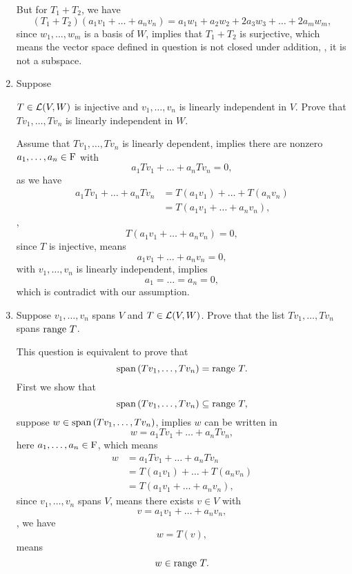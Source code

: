 \begin{enumerate}
\begin{solution}
            But for $T_1+T_2$, we have 
            \[ (T_1+T_2)(a_1v_1 + \dots + a_nv_n) = a_1w_1 + a_2w_2 + 2a_3w_3 + \dots + 2a_mw_m ,\]
            since $w_1, \ldots, w_m$ is a basis of $W$, implies that $T_1 + T_2$ is surjective, which means the vector space defined 
            in question is not closed under addition, \ie, it is not a subspace.
        \end{solution}
    \item \hypertarget{3B-9}{Suppose} $T \in \mathcal{L}(V, W)$ is injective and $v_1, \ldots, v_n$ is linearly independent in $V$.
        Prove that $Tv_1, \ldots, Tv_n$ is linearly independent in $W$.
        \begin{solution}
            Assume that $Tv_1, \ldots, Tv_n$ is linearly dependent, implies there are nonzero $a_1, \ldots, a_n \in \mathrm{F}$ with 
            \[ a_1Tv_1 + \dots + a_nTv_n = 0,\]
            as we have 
            \begin{align*}
                a_1Tv_1 + \dots + a_nTv_n &= T(a_1v_1) + \dots + T(a_nv_n) \\
                                          &= T(a_1v_1 + \dots + a_nv_n) ,
            \end{align*}
            \ie, 
            \[ T(a_1v_1 + \dots + a_nv_n) = 0, \]
            since $T$ is injective, means 
            \[ a_1v_1 + \dots + a_nv_n = 0,\]
            with $v_1, \ldots, v_n$ is linearly independent, implies
            \[ a_1 = \dots = a_n = 0, \]
            which is contradict with our assumption.
        \end{solution}
    \item Suppose $v_1, \ldots, v_n$ spans $V$ and $T \in \mathcal{L}(V, W)$. Prove that the list $Tv_1, \ldots, Tv_n$ spans $\text{range}~T$.
        \begin{solution}
            This question is equivalent to prove that 
            \[ \text{span}\left(Tv_1, \ldots, Tv_n\right) = \text{range}~T .\]
            First we show that 
            \[ \text{span}\left(Tv_1, \ldots, Tv_n\right) \subseteq \text{range}~T ,\]
            suppose $w \in \text{span}\left(Tv_1, \ldots, Tv_n\right)$, implies $w$ can be written in 
            \[ w = a_1Tv_1 + \dots + a_nTv_n,\]
            here $a_1, \ldots, a_n \in \mathrm{F}$, which means 
            \begin{align*}
                w &= a_1Tv_1 + \dots + a_nTv_n \\
                  &= T(a_1v_1) + \dots + T(a_nv_n) \\
                  &= T(a_1v_1 + \dots + a_nv_n),
            \end{align*}
            since $v_1, \ldots, v_n$ spans $V$, means there exists $v \in V$ with 
            \[ v = a_1v_1 + \dots + a_nv_n,\]
            \ie, we have 
            \[ w = T(v) ,\]
            means 
            \[ w \in \text{range}~T .\]


\end{solution}
\end{enumerate}
